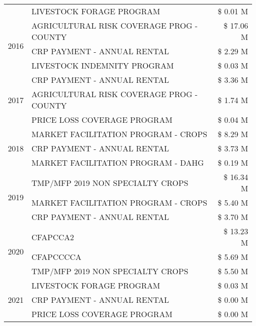 \begin{tabular}{llr}
 & LIVESTOCK FORAGE PROGRAM & \$ 0.01 M \\
\cline{1-3}
\multirow[t]{3}{*}{2016} & AGRICULTURAL RISK COVERAGE PROG - COUNTY & \$ 17.06 M \\
 & CRP PAYMENT - ANNUAL RENTAL & \$ 2.29 M \\
 & LIVESTOCK INDEMNITY PROGRAM & \$ 0.03 M \\
\cline{1-3}
\multirow[t]{3}{*}{2017} & CRP PAYMENT - ANNUAL RENTAL & \$ 3.36 M \\
 & AGRICULTURAL RISK COVERAGE PROG - COUNTY & \$ 1.74 M \\
 & PRICE LOSS COVERAGE PROGRAM & \$ 0.04 M \\
\cline{1-3}
\multirow[t]{3}{*}{2018} & MARKET FACILITATION PROGRAM - CROPS & \$ 8.29 M \\
 & CRP PAYMENT - ANNUAL RENTAL & \$ 3.73 M \\
 & MARKET FACILITATION PROGRAM - DAHG & \$ 0.19 M \\
\cline{1-3}
\multirow[t]{3}{*}{2019} & TMP/MFP 2019 NON SPECIALTY CROPS & \$ 16.34 M \\
 & MARKET FACILITATION PROGRAM - CROPS & \$ 5.40 M \\
 & CRP PAYMENT - ANNUAL RENTAL & \$ 3.70 M \\
\cline{1-3}
\multirow[t]{3}{*}{2020} & CFAPCCA2 & \$ 13.23 M \\
 & CFAPCCCCA & \$ 5.69 M \\
 & TMP/MFP 2019 NON SPECIALTY CROPS & \$ 5.50 M \\
\cline{1-3}
\multirow[t]{3}{*}{2021} & LIVESTOCK FORAGE PROGRAM & \$ 0.03 M \\
 & CRP PAYMENT - ANNUAL RENTAL & \$ 0.00 M \\
 & PRICE LOSS COVERAGE PROGRAM & \$ 0.00 M \\
\cline{1-3}
\bottomrule
\end{tabular}
